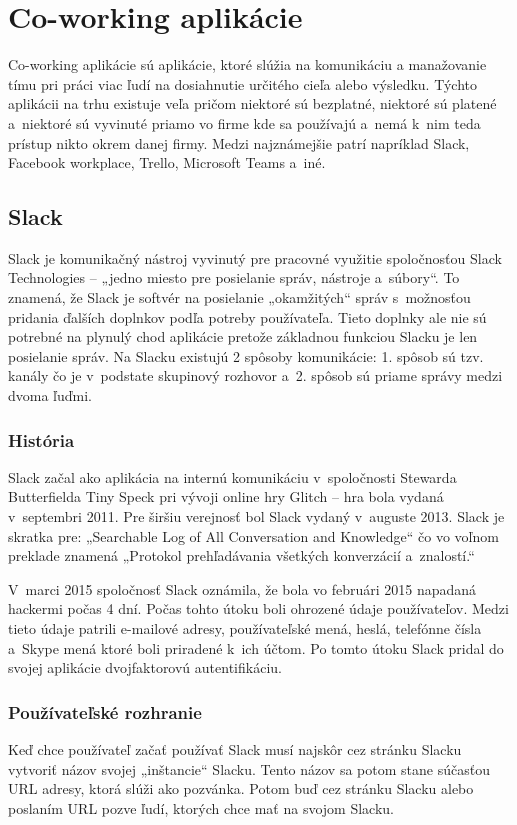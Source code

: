 \section{Co-working aplikácie}
\indent Co-working aplikácie sú aplikácie, ktoré slúžia na komunikáciu a manažovanie tímu pri práci viac ľudí na dosiahnutie určitého cieľa alebo výsledku. Týchto aplikácii na trhu existuje veľa pričom niektoré sú bezplatné, niektoré sú platené a niektoré sú vyvinuté priamo vo firme kde sa používajú a nemá k nim teda prístup nikto okrem danej firmy. Medzi najznámejšie patrí napríklad Slack, Facebook workplace, Trello, Microsoft Teams a iné. 
\subsection{Slack}
\indent Slack je komunikačný nástroj vyvinutý pre pracovné využitie spoločnosťou Slack Technologies – „jedno miesto pre posielanie správ, nástroje a súbory“. To znamená, že Slack je softvér na posielanie „okamžitých“ správ s možnosťou pridania ďalších doplnkov podľa potreby používateľa. Tieto doplnky ale nie sú potrebné na plynulý chod aplikácie pretože základnou funkciou Slacku je len posielanie správ. Na Slacku existujú 2 spôsoby komunikácie: 1. spôsob sú tzv. kanály čo je v podstate skupinový rozhovor a 2. spôsob sú priame správy medzi dvoma ľuďmi. 
\subsubsection{História}
\indent Slack začal ako aplikácia na internú komunikáciu v spoločnosti Stewarda Butterfielda Tiny Speck pri vývoji online hry Glitch – hra bola vydaná v septembri 2011. Pre širšiu verejnosť bol Slack vydaný v auguste 2013. Slack je skratka pre: „Searchable Log of All Conversation and Knowledge“ čo vo voľnom preklade znamená „Protokol prehľadávania všetkých konverzácií a znalostí.“

\indent V marci 2015 spoločnosť Slack oznámila, že bola vo februári 2015 napadaná hackermi počas 4 dní. Počas tohto útoku boli ohrozené údaje používateľov. Medzi tieto údaje patrili e-mailové adresy, používateľské mená, heslá, telefónne čísla a Skype mená ktoré boli priradené k ich účtom. Po tomto útoku Slack pridal do svojej aplikácie dvojfaktorovú autentifikáciu. 
\subsubsection{Používateľské rozhranie}
\indent Keď chce používateľ začať používať Slack musí najskôr cez stránku Slacku vytvoriť názov svojej „inštancie“ Slacku. Tento názov sa potom stane súčasťou URL adresy, ktorá slúži ako pozvánka. Potom buď cez stránku Slacku alebo poslaním URL pozve ľudí, ktorých chce mať na svojom Slacku. 

